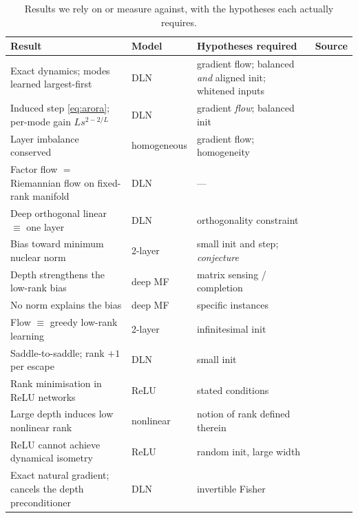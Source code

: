 \documentclass{article} %
\theoremstyle{plain}
\theoremstyle{definition}
\theoremstyle{remark}
\begin{document}
\begin{table}[t]
\caption{Results we rely on or measure against, with the hypotheses each actually requires.}
\label{tab:sota}
\begin{center}
\small
\begin{tabular}{p{4.0cm}p{1.6cm}p{5.0cm}p{2.2cm}}
\toprule
\textbf{Result} & \textbf{Model} & \textbf{Hypotheses required} & \textbf{Source} \\
\midrule
Exact dynamics; modes learned largest-first & DLN &
gradient flow; balanced \emph{and} aligned init; whitened inputs & \citet{saxe2014exact} \\
Induced step \eqref{eq:arora}; per-mode gain $L s^{2-2/L}$ & DLN &
gradient \emph{flow}; balanced init & \citet{arora2018optimization} \\
Layer imbalance conserved & homogeneous &
gradient flow; homogeneity & \citet{du2018algorithmic} \\
Factor flow $=$ Riemannian flow on fixed-rank manifold & DLN & --- & \citet{bah2022learning} \\
Deep orthogonal linear $\equiv$ one layer & DLN & orthogonality constraint & \citet{ablin2020deep} \\
Bias toward minimum nuclear norm & 2-layer & small init and step; \emph{conjecture} & \citet{gunasekar2017implicit} \\
Depth strengthens the low-rank bias & deep MF & matrix sensing / completion & \citet{arora2019implicit} \\
No norm explains the bias & deep MF & specific instances & \citet{razin2020implicit} \\
Flow $\equiv$ greedy low-rank learning & 2-layer & infinitesimal init & \citet{li2021towards} \\
Saddle-to-saddle; rank $+1$ per escape & DLN & small init & \citet{jacot2021saddle} \\
Rank minimisation in ReLU networks & ReLU & stated conditions & \citet{timor2023implicit} \\
Large depth induces low nonlinear rank & nonlinear & notion of rank defined therein & \citet{jacot2023implicit} \\
ReLU cannot achieve dynamical isometry & ReLU & random init, large width & \citet{pennington2017resurrecting} \\
Exact natural gradient; cancels the depth preconditioner & DLN & invertible Fisher & \citet{bernacchia2018exact} \\
\bottomrule
\end{tabular}
\end{center}
\end{table}
\end{document}
